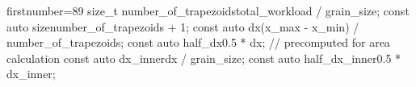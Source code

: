 \begin{cppcode*}{firstnumber=89}
    size_t number_of_trapezoids{total_workload / grain_size};
    const auto size{number_of_trapezoids + 1};
    const auto dx{(x_max - x_min) / number_of_trapezoids};
    const auto half_dx{0.5 * dx}; // precomputed for area calculation
    const auto dx_inner{dx / grain_size};
    const auto half_dx_inner{0.5 * dx_inner};
\end{cppcode*}
